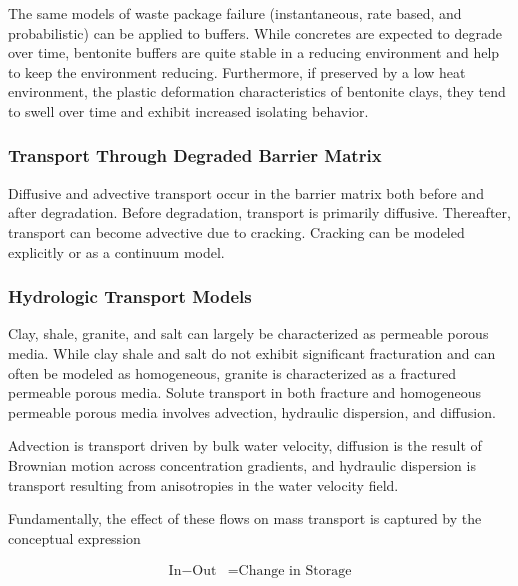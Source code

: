 The same models of waste package failure (instantaneous, rate based, and 
probabilistic) can be applied to buffers. While concretes are expected to 
degrade over time, bentonite buffers are quite stable in a reducing 
environment and help to keep the environment reducing. Furthermore, if 
preserved by a low heat environment, the plastic deformation characteristics
of bentonite clays, they tend to swell over time and exhibit increased 
isolating behavior.

\subsubsection{Transport Through Degraded Barrier Matrix}

Diffusive and advective transport occur in the barrier matrix both before and 
after degradation. Before degradation, transport is primarily diffusive. 
Thereafter, transport can become advective due to cracking. Cracking can be 
modeled explicitly or as a continuum model.  


\subsubsection{Hydrologic Transport Models}

Clay, shale, granite, and salt can largely be characterized as permeable porous 
media. While clay shale and salt do not exhibit significant fracturation and can 
often be modeled as homogeneous, granite is  characterized as a fractured 
permeable porous media.  Solute transport in both fracture and homogeneous 
permeable porous media involves advection, hydraulic dispersion, and diffusion. 

Advection is transport driven by bulk water velocity, diffusion is the 
result of Brownian motion across concentration gradients, and hydraulic 
dispersion is transport resulting from anisotropies in the water velocity field. 

Fundamentally, the effect of these flows on mass transport is captured by the 
conceptual expression 

\begin{align}
  \mbox{In} - \mbox{Out} &= \mbox{Change in Storage}
  \label{inout}
\end{align} 



